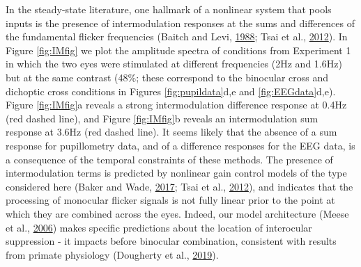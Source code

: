 \documentclass[
]{article}
\begin{document}
In the steady-state literature, one hallmark of a nonlinear system that pools inputs is the presence of intermodulation responses at the sums and differences of the fundamental flicker frequencies (Baitch and Levi, \protect\hyperlink{ref-Baitch1988}{1988}; Tsai et al., \protect\hyperlink{ref-Tsai2012}{2012}). In Figure \ref{fig:IMfig} we plot the amplitude spectra of conditions from Experiment 1 in which the two eyes were stimulated at different frequencies (2Hz and 1.6Hz) but at the same contrast (48\%; these correspond to the binocular cross and dichoptic cross conditions in Figures \ref{fig:pupildata}d,e and \ref{fig:EEGdata}d,e). Figure \ref{fig:IMfig}a reveals a strong intermodulation difference response at 0.4Hz (red dashed line), and Figure \ref{fig:IMfig}b reveals an intermodulation sum response at 3.6Hz (red dashed line). It seems likely that the absence of a sum response for pupillometry data, and of a difference responses for the EEG data, is a consequence of the temporal constraints of these methods. The presence of intermodulation terms is predicted by nonlinear gain control models of the type considered here (Baker and Wade, \protect\hyperlink{ref-Baker2017}{2017}; Tsai et al., \protect\hyperlink{ref-Tsai2012}{2012}), and indicates that the processing of monocular flicker signals is not fully linear prior to the point at which they are combined across the eyes. Indeed, our model architecture (Meese et al., \protect\hyperlink{ref-Meese2006}{2006}) makes specific predictions about the location of interocular suppression - it impacts before binocular combination, consistent with results from primate physiology (Dougherty et al., \protect\hyperlink{ref-Dougherty2019}{2019}).
\end{document}
